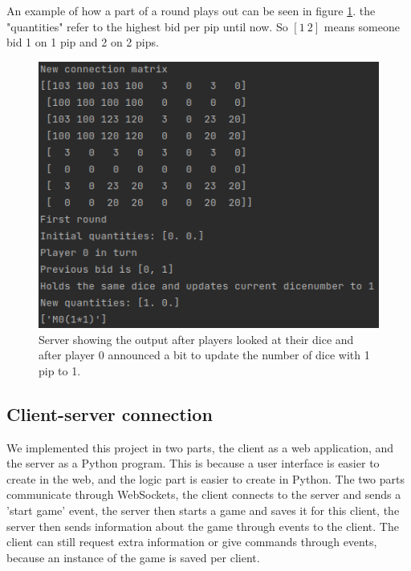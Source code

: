 \documentclass{article}
\begin{document}
An example of how a part of a round plays out can be seen in figure \ref{fig:halfaround}. the "quantities" refer to the highest bid per pip until now. So $[1\ 2]$ means someone bid 1 on 1 pip and 2 on 2 pips.
\begin{figure}[h!]
    \centering
    \includegraphics[width=.6\textwidth]{img/halfaround.png}
    \caption{Server showing the output after players looked at their dice and after player 0 announced a bit to update the number of dice with 1 pip to 1.}
    \label{fig:halfaround}
\end{figure}

\subsection*{Client-server connection} %
We implemented this project in two parts, the client as a web application, and the server as a Python program. This is because a user interface is easier to create in the web, and the logic part is easier to create in Python. The two parts communicate through WebSockets, the client connects to the server and sends a 'start game' event, the server then starts a game and saves it for this client, the server then sends information about the game through events to the client. The client can still request extra information or give commands through events, because an instance of the game is saved per client. 
\end{document}
